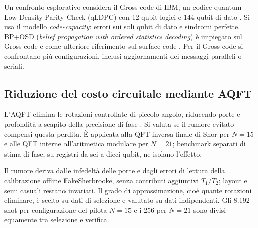 Un confronto esplorativo considera il Gross code di IBM, un codice quantum Low-Density
Parity-Check (qLDPC) con 12 qubit logici e 144 qubit di dato \cite{bravyi2024}. Si usa il
modello \emph{code-capacity}: errori sui soli qubit di dato e sindromi perfette. BP+OSD
(\emph{belief propagation with ordered statistics decoding}) è impiegato sul Gross code e come
ulteriore riferimento sul surface code \cite{roffe2020}. Per il Gross code si confrontano più
configurazioni, inclusi aggiornamenti dei messaggi paralleli o seriali.

\subsection{Riduzione del costo circuitale mediante AQFT}

L'AQFT elimina le rotazioni controllate di piccolo angolo, riducendo porte e profondità a
scapito della precisione di fase \cite{barencoAQFT1996}. Si valuta se il rumore evitato
compensi questa perdita. È applicata alla QFT inversa finale di Shor per \(N = 15\) e alle QFT
interne all'aritmetica modulare per \(N = 21\); benchmark separati di stima di fase, su
registri da sei a dieci qubit, ne isolano l'effetto.

Il rumore deriva dalle infedeltà delle porte e dagli errori di lettura della calibrazione
offline FakeSherbrooke, senza contributi aggiuntivi \(T_1/T_2\); layout e semi casuali restano
invariati. Il grado di approssimazione, cioè quante rotazioni eliminare, è scelto su dati di
selezione e valutato su dati indipendenti. Gli 8.192 shot per configurazione del pilota
\(N = 15\) e i 256 per \(N = 21\) sono divisi equamente tra selezione e verifica.
